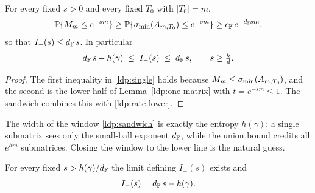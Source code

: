 \begin{proposition}\label{ldp:upper-tail-low}
For every fixed \(s>0\) and every fixed \(T_0\) with \(|T_0|=m\),
\begin{equation}\label{ldp:single}
  \mathbb{P}\{M_m\le e^{-sm}\}\ge \mathbb{P}\{\sigma_{\min}(A_{m,T_0})\le e^{-sm}\}\ge c_{\mathbb{F}}\,e^{-d_{\mathbb{F}} s m},
\end{equation}
so that \(I_-(s)\le d_{\mathbb{F}}\,s\).  In particular
\begin{equation}\label{ldp:sandwich}
  d_{\mathbb{F}}\,s-h(\gamma)\;\le\;I_-(s)\;\le\;d_{\mathbb{F}}\,s,\qquad s\ge \tfrac{h}{d}.
\end{equation}
\end{proposition}

\begin{proof}
The first inequality in \eqref{ldp:single} holds because
\(M_m\le\sigma_{\min}(A_{m,T_0})\), and the second is the lower half of
Lemma~\ref{ldp:one-matrix} with \(t=e^{-sm}\le1\).  The sandwich combines this
with \eqref{ldp:rate-lower}.
\end{proof}

The width of the window \eqref{ldp:sandwich} is exactly the entropy \(h(\gamma)\):
a single submatrix sees only the small-ball exponent \(d_{\mathbb{F}}\), while the union
bound credits all \(e^{hm}\) submatrices.  Closing the window to the lower line is
the natural guess.

\begin{conjecture}\label{ldp:exact-rate}
For every fixed \(s>h(\gamma)/d_{\mathbb{F}}\) the limit defining \(I_-(s)\) exists and
\begin{equation}\label{ldp:exact}
  I_-(s)=d_{\mathbb{F}}\,s-h(\gamma).
\end{equation}
\end{conjecture}

